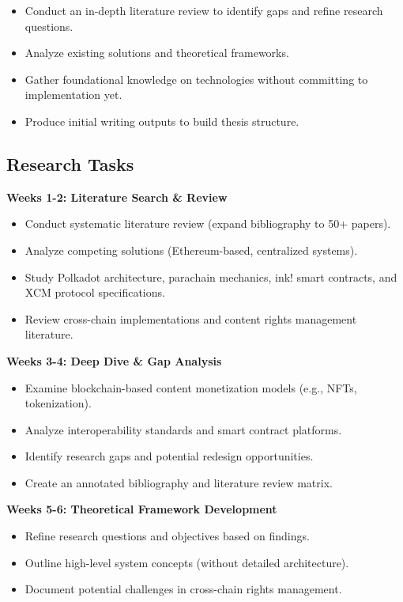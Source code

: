 \documentclass[12pt,a4paper]{article}
\begin{document}
\begin{itemize}
    \item Conduct an in-depth literature review to identify gaps and refine research questions.
    \item Analyze existing solutions and theoretical frameworks.
    \item Gather foundational knowledge on technologies without committing to implementation yet.
    \item Produce initial writing outputs to build thesis structure.
\end{itemize}

\subsection*{Research Tasks}

\textbf{Weeks 1-2: Literature Search \& Review}
\begin{itemize}
    \item Conduct systematic literature review (expand bibliography to 50+ papers).
    \item Analyze competing solutions (Ethereum-based, centralized systems).
    \item Study Polkadot architecture, parachain mechanics, ink! smart contracts, and XCM protocol specifications.
    \item Review cross-chain implementations and content rights management literature.
\end{itemize}

\textbf{Weeks 3-4: Deep Dive \& Gap Analysis}
\begin{itemize}
    \item Examine blockchain-based content monetization models (e.g., NFTs, tokenization).
    \item Analyze interoperability standards and smart contract platforms.
    \item Identify research gaps and potential redesign opportunities.
    \item Create an annotated bibliography and literature review matrix.
\end{itemize}

\textbf{Weeks 5-6: Theoretical Framework Development}
\begin{itemize}
    \item Refine research questions and objectives based on findings.
    \item Outline high-level system concepts (without detailed architecture).
    \item Document potential challenges in cross-chain rights management.
\end{itemize}
\end{document}
